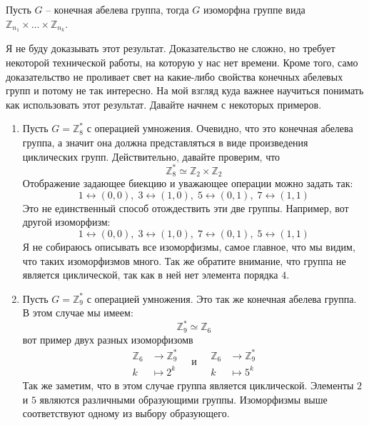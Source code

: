 \begin{claim}
Пусть $G$ -- конечная абелева группа, тогда $G$ изоморфна группе вида $\mathbb Z_{n_1}\times \ldots \times \mathbb Z_{n_k}$.
\end{claim}

Я не буду доказывать этот результат.
Доказательство не сложно, но требует некоторой технической работы, на которую у нас нет времени.
Кроме того, само доказательство не проливает свет на какие-либо свойства конечных абелевых групп и потому не так интересно.
На мой взгляд куда важнее научиться понимать как использовать этот результат.
Давайте начнем с некоторых примеров.

\begin{examples}
\begin{enumerate}
\item Пусть $G = \mathbb Z_8^*$ с операцией умножения.
Очевидно, что это конечная абелева группа, а значит она должна представляться в виде произведения циклических групп.
Действительно, давайте проверим, что
\[
\mathbb Z_8^* \simeq \mathbb Z_2\times \mathbb Z_2
\]
Отображение задающее биекцию и уважающее операции можно задать так:
\[
1 \leftrightarrow (0,0),\; 3 \leftrightarrow (1,0),\; 5\leftrightarrow(0,1),\;7\leftrightarrow(1,1)
\]
Это не единственный способ отождествить эти две группы.
Например, вот другой изоморфизм:
\[
1 \leftrightarrow (0,0),\; 3 \leftrightarrow (1,0),\; 7\leftrightarrow(0,1),\;5\leftrightarrow(1,1)
\]
Я не собираюсь описывать все изоморфизмы, самое главное, что мы видим, что таких изоморфизмов много.
Так же обратите внимание, что группа не является циклической, так как в ней нет элемента порядка $4$.

\item Пусть $G = \mathbb Z_9^*$ с операцией умножения.
Это так же конечная абелева группа.
В этом случае мы имеем:
\[
\mathbb Z_9^* \simeq \mathbb Z_6
\]
вот пример двух разных изоморфизомв
\[
\begin{aligned}
\mathbb Z_6 &\to \mathbb Z_9^*\\
k &\mapsto 2^k
\end{aligned}
\quad\text{и}\quad
\begin{aligned}
\mathbb Z_6 &\to \mathbb Z_9^*\\
k &\mapsto 5^k
\end{aligned}
\]
Так же заметим, что в этом случае группа является циклической.
Элементы $2$ и $5$ являются различными образующими группы.
Изоморфизмы выше соответствуют одному из выбору образующего.
\end{enumerate}
\end{examples}


